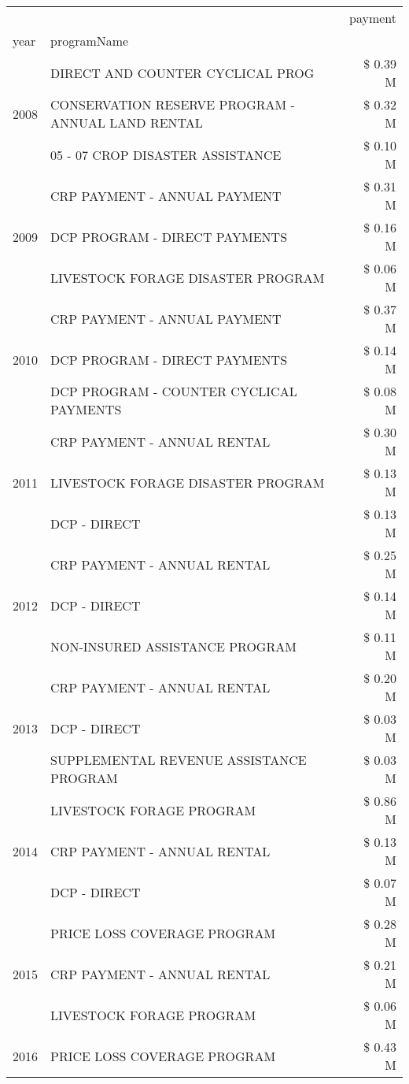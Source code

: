 \begin{tabular}{llr}
\toprule
 &  & payment \\
year & programName &  \\
\midrule
\multirow[t]{3}{*}{2008} & DIRECT AND COUNTER CYCLICAL PROG & \$ 0.39 M \\
 & CONSERVATION RESERVE PROGRAM - ANNUAL LAND RENTAL & \$ 0.32 M \\
 & 05 - 07 CROP DISASTER ASSISTANCE & \$ 0.10 M \\
\cline{1-3}
\multirow[t]{3}{*}{2009} & CRP PAYMENT - ANNUAL PAYMENT & \$ 0.31 M \\
 & DCP PROGRAM - DIRECT PAYMENTS & \$ 0.16 M \\
 & LIVESTOCK FORAGE DISASTER  PROGRAM & \$ 0.06 M \\
\cline{1-3}
\multirow[t]{3}{*}{2010} & CRP PAYMENT - ANNUAL PAYMENT & \$ 0.37 M \\
 & DCP PROGRAM - DIRECT PAYMENTS & \$ 0.14 M \\
 & DCP PROGRAM - COUNTER CYCLICAL PAYMENTS & \$ 0.08 M \\
\cline{1-3}
\multirow[t]{3}{*}{2011} & CRP PAYMENT - ANNUAL RENTAL & \$ 0.30 M \\
 & LIVESTOCK FORAGE DISASTER PROGRAM & \$ 0.13 M \\
 & DCP - DIRECT & \$ 0.13 M \\
\cline{1-3}
\multirow[t]{3}{*}{2012} & CRP PAYMENT - ANNUAL RENTAL & \$ 0.25 M \\
 & DCP - DIRECT & \$ 0.14 M \\
 & NON-INSURED ASSISTANCE PROGRAM & \$ 0.11 M \\
\cline{1-3}
\multirow[t]{3}{*}{2013} & CRP PAYMENT - ANNUAL RENTAL & \$ 0.20 M \\
 & DCP - DIRECT & \$ 0.03 M \\
 & SUPPLEMENTAL REVENUE ASSISTANCE PROGRAM & \$ 0.03 M \\
\cline{1-3}
\multirow[t]{3}{*}{2014} & LIVESTOCK FORAGE PROGRAM & \$ 0.86 M \\
 & CRP PAYMENT - ANNUAL RENTAL & \$ 0.13 M \\
 & DCP - DIRECT & \$ 0.07 M \\
\cline{1-3}
\multirow[t]{3}{*}{2015} & PRICE LOSS COVERAGE PROGRAM & \$ 0.28 M \\
 & CRP PAYMENT - ANNUAL RENTAL & \$ 0.21 M \\
 & LIVESTOCK FORAGE PROGRAM & \$ 0.06 M \\
\cline{1-3}
\multirow[t]{3}{*}{2016} & PRICE LOSS COVERAGE PROGRAM                   & \$ 0.43 M \\

\end{tabular}

